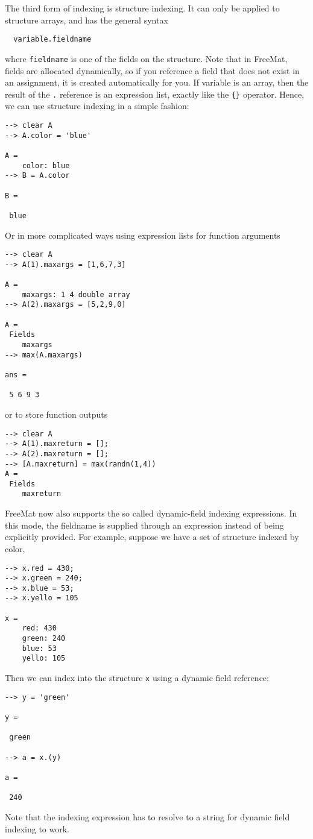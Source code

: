 The third form of indexing is structure indexing.  It can only
be applied to structure arrays, and has the general syntax
\begin{verbatim}
  variable.fieldname
\end{verbatim}
where \verb|fieldname| is one of the fields on the structure.  Note that
in FreeMat, fields are allocated dynamically, so if you reference
a field that does not exist in an assignment, it is created automatically
for you.  If variable is an array, then the result of the \verb|.| 
reference is an expression list, exactly like the \verb|{}| operator.  Hence,
we can use structure indexing in a simple fashion:
\begin{verbatim}
--> clear A
--> A.color = 'blue'

A = 
    color: blue
--> B = A.color

B = 

 blue
\end{verbatim}
Or in more complicated ways using expression lists for function arguments
\begin{verbatim}
--> clear A
--> A(1).maxargs = [1,6,7,3]

A = 
    maxargs: 1 4 double array
--> A(2).maxargs = [5,2,9,0]

A = 
 Fields
    maxargs
--> max(A.maxargs)

ans = 

 5 6 9 3 
\end{verbatim}
or to store function outputs
\begin{verbatim}
--> clear A
--> A(1).maxreturn = [];
--> A(2).maxreturn = [];
--> [A.maxreturn] = max(randn(1,4))
A = 
 Fields
    maxreturn
\end{verbatim}
FreeMat now also supports the so called dynamic-field indexing 
expressions.  In this mode, the fieldname is supplied through 
an expression instead of being explicitly provided.  For example,
suppose we have a set of structure indexed by color,
\begin{verbatim}
--> x.red = 430;
--> x.green = 240;
--> x.blue = 53;
--> x.yello = 105

x = 
    red: 430
    green: 240
    blue: 53
    yello: 105
\end{verbatim}
Then we can index into the structure \verb|x| using a dynamic field
reference:
\begin{verbatim}
--> y = 'green'

y = 

 green

--> a = x.(y)

a = 

 240 
\end{verbatim}
Note that the indexing expression has to resolve to a string for
dynamic field indexing to work.
